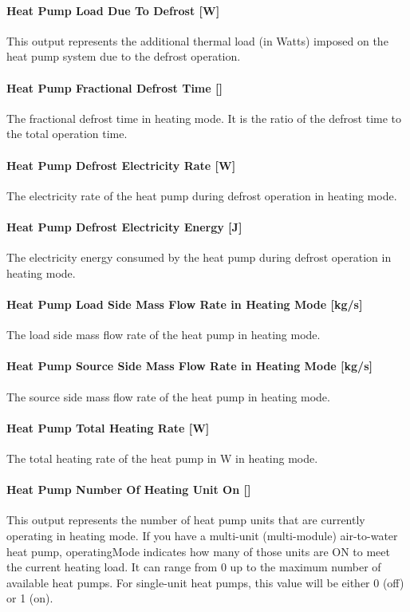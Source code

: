 \paragraph{Heat Pump Load Due To Defrost {[}W{]}}
This output represents the additional thermal load (in Watts) imposed on the heat pump
system due to the defrost operation.
\paragraph{Heat Pump Fractional Defrost Time {[}{]}} The fractional defrost
time in heating mode. It is the ratio of the defrost time to the total operation
time.
\paragraph{Heat Pump Defrost Electricity Rate {[}W{]}} The electricity rate of
the heat pump during defrost operation in heating mode.
\paragraph{Heat Pump Defrost Electricity Energy {[}J{]}} The electricity energy
consumed by the heat pump during defrost operation in heating mode.
\paragraph{Heat Pump Load Side Mass Flow Rate in Heating Mode {[}kg/s{]}} The
load side mass flow rate of the heat pump in heating mode.
\paragraph{Heat Pump Source Side Mass Flow Rate in Heating Mode {[}kg/s{]}} The
source side mass flow rate of the heat pump in heating mode.
\paragraph{Heat Pump Total Heating Rate {[}W{]}} The total heating rate of the
heat pump in W in heating mode.
\paragraph{Heat Pump Number Of Heating Unit On {[}{]}}
This output represents the number of heat pump units that are currently operating
in heating mode. If you have a multi-unit (multi-module) air-to-water heat pump,
operatingMode indicates how many of those units are ON to meet the current heating load.
It can range from 0 up to the maximum number of available heat pumps. For single-unit heat pumps,
this value will be either 0 (off) or 1 (on).
